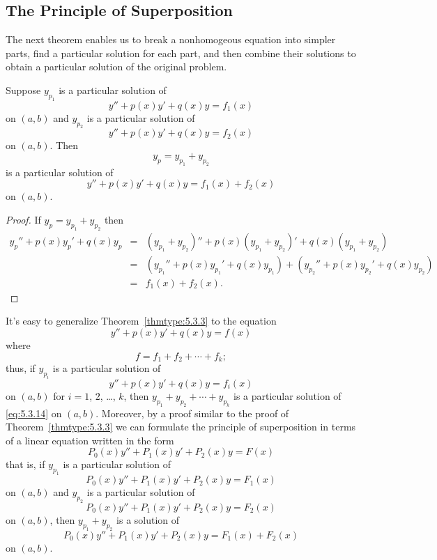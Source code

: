 \documentclass{ximera}
\begin{document}
\subsection*{The Principle of Superposition}
 
The next theorem enables us to break a nonhomogeous equation into
simpler parts, find a particular solution for each part, and then
combine their solutions to obtain a particular solution of the
original problem.
 
\begin{theorem}
\label{thmtype:5.3.3}
Suppose  $y_{p_1}$ is a particular solution of
$$
y''+p(x)y'+q(x)y=f_1(x)
$$
on $(a,b)$ and $y_{p_2}$ is a particular solution of
$$
y''+p(x)y'+q(x)y=f_2(x)
$$
on   $(a,b)$.
 Then
$$
y_p=y_{p_1}+y_{p_2}
$$
is a particular  solution of
$$
y''+p(x)y'+q(x)y=f_1(x)+f_2(x)
$$
on  $(a,b)$.
\end{theorem}
 
\begin{proof} If $y_p=y_{p_1}+y_{p_2}$ then
\begin{eqnarray*}
y_p''+p(x)y_p'+q(x)y_p&=&(y_{p_1}+y_{p_2})''+p(x)(y_{p_1}+y_{p_2})'
+q(x)(y_{p_1}+y_{p_2})\\
&=&\left(y_{p_1}''+p(x)y_{p_1}'+q(x)y_{p_1}\right)
+\left(y_{p_2}''+p(x)y_{p_2}'+q(x)y_{p_2}\right)\\
&=&f_1(x)+f_2(x).
\end{eqnarray*}
\end{proof}
 
 
It's easy to generalize  Theorem~\ref{thmtype:5.3.3}
to the equation
\begin{equation} \label{eq:5.3.14}
y''+p(x)y'+q(x)y=f(x)
\end{equation}
where
$$
f=f_1+f_2+\cdots+f_k;
$$
thus, if $y_{p_i}$ is a particular solution of
$$
y''+p(x)y'+q(x)y=f_i(x)
$$
on $(a,b)$ for $i=1$, $2$, \dots, $k$, then
$y_{p_1}+y_{p_2}+\cdots+y_{p_k}$
is a particular solution of \eqref{eq:5.3.14} on $(a,b)$. Moreover, by a
proof similar to the proof of Theorem~\ref{thmtype:5.3.3} we can formulate
the principle of superposition in terms of a linear equation written
in the form
$$
P_0(x)y''+P_1(x)y'+P_2(x)y=F(x)
$$
   that is, if $y_{p_1}$
is a particular solution of
$$
P_0(x)y''+P_1(x)y'+P_2(x)y=F_1(x)
$$
on $(a,b)$ and $y_{p_2}$ is a particular solution of
$$
P_0(x)y''+P_1(x)y'+P_2(x)y=F_2(x)
$$
on  $(a,b)$, then $y_{p_1}+y_{p_2}$ is a solution of
$$
P_0(x)y''+P_1(x)y'+P_2(x)y=F_1(x)+F_2(x)
$$
on $(a,b)$.
 
\end{document}
